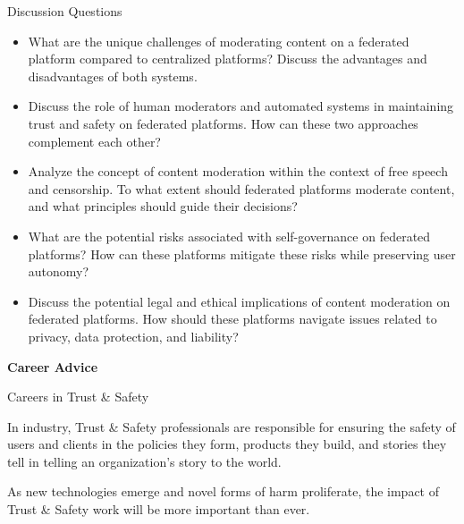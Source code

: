 \documentclass[nobackground,dvipsnames,table]{beamer}
\begin{document}
\begin{frame}{Discussion Questions}

\small{
\begin{itemize}
    \item What are the unique challenges of moderating content on a federated platform compared to centralized platforms? Discuss the advantages and disadvantages of both systems.
    \item Discuss the role of human moderators and automated systems in maintaining trust and safety on federated platforms. How can these two approaches complement each other?
    \item Analyze the concept of content moderation within the context of free speech and censorship. To what extent should federated platforms moderate content, and what principles should guide their decisions?
    \item What are the potential risks associated with self-governance on federated platforms? How can these platforms mitigate these risks while preserving user autonomy?
    \item Discuss the potential legal and ethical implications of content moderation on federated platforms. How should these platforms navigate issues related to privacy, data protection, and liability?
\end{itemize}
}


\end{frame}



\begin{frame}{}

\Huge{\textbf{Career Advice}}

\end{frame}




\begin{frame}{Careers in Trust \& Safety}

In industry, Trust \& Safety professionals are responsible for ensuring the safety of users and clients in the policies they form, products they build, and stories they tell in telling an organization's story to the world. \newline

As new technologies emerge and novel forms of harm proliferate,  the impact of Trust \& Safety work will be more important than ever.


\end{frame}
\end{document}
